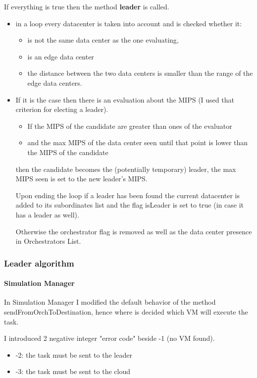 \documentclass[12pt]{report}
\begin{document}
If everything is true then the method \textbf{leader} is called.
  	\begin{itemize}
 		\item in a loop every datacenter is taken into account and is checked whether it:
 		\begin{itemize}
 			\item is not the same data center as the one evaluating,
 			\item is an edge data center
 			\item the distance between the two data centers is smaller than the range of the edge data centers.
 		\end{itemize}
 		\item If it is the case then there is an evaluation about the MIPS (I used that criterion for electing a leader).
 		\begin{itemize}
 			\item If the MIPS of the candidate are greater than ones of the evaluator
 			\item and the max MIPS of the data center seen until that point is lower than the MIPS of the candidate
 		\end{itemize}

then the candidate becomes the (potentially temporary) leader, the max MIPS seen is set to the new leader's MIPS.

Upon ending the loop if a leader has been found the current datacenter is added to its subordinates list and the flag isLeader is set to true (in case it has a leader as well).
 		
Otherwise the orchestrator flag is removed as well as the data center presence in Orchestrators List.
  	\end{itemize}
\subsubsection*{Leader algorithm}
\paragraph{Simulation Manager}

In Simulation Manager I modified the default behavior of the method sendFromOrchToDestination, hence where is decided which VM will execute the task.

I introduced 2 negative integer "error code" beside -1 (no VM found).
\begin{itemize}
	\item -2: the task must be sent to the leader
	\item -3: the task must be sent to the cloud
\end{itemize}
\end{document}
